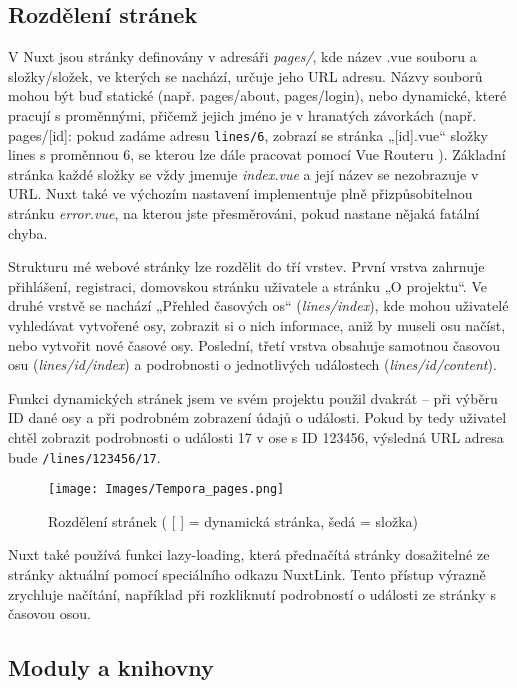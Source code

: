 \subsection{Rozdělení stránek}
V Nuxt jsou stránky definovány v adresáři \textit{pages/}, kde název .vue souboru a složky/složek, ve kterých se nachází, určuje jeho URL adresu. Názvy souborů mohou být buď statické (např. pages/about, pages/login), nebo dynamické, které pracují s proměnnými, přičemž jejich jméno je v hranatých závorkách (např. pages/[id]: pokud zadáme adresu \texttt{lines/6}, zobrazí se stránka „[id].vue“ složky lines s proměnnou 6, se kterou lze dále pracovat pomocí Vue Routeru \cite{NUXT}). Základní stránka každé složky se vždy jmenuje \textit{index.vue} a její název se nezobrazuje v URL. Nuxt také ve výchozím nastavení implementuje plně přizpůsobitelnou stránku \textit{error.vue}, na kterou jste přesměrováni, pokud nastane nějaká fatální chyba.

Strukturu mé webové stránky lze rozdělit do tří vrstev. První vrstva zahrnuje přihlášení, registraci, domovskou stránku uživatele a stránku „O projektu“. Ve druhé vrstvě se nachází „Přehled časových os“ (\textit{lines/index}), kde mohou uživatelé vyhledávat vytvořené osy, zobrazit si o nich informace, aniž by museli osu načíst, nebo vytvořit nové časové osy. Poslední, třetí vrstva obsahuje samotnou časovou osu (\textit{lines/id/index}) a podrobnosti o jednotlivých událostech (\textit{lines/id/content}).

Funkci dynamických stránek jsem ve svém projektu použil dvakrát – při výběru ID dané osy a při podrobném zobrazení údajů o události. Pokud by tedy uživatel chtěl zobrazit podrobnosti o události 17 v ose s ID 123456, výsledná URL adresa bude \texttt{/lines/123456/17}.


\begin{figure}[h]
    \centering
    \texttt{[image: Images/Tempora\_pages.png]}
    \caption{Rozdělení stránek ( [ ] = dynamická stránka, šedá = složka)}
    \label{fig:pages}
\end{figure}
Nuxt také používá funkci lazy-loading, která přednačítá stránky dosažitelné ze stránky aktuální pomocí speciálního odkazu NuxtLink. Tento přístup výrazně zrychluje načítání, například při rozkliknutí podrobností o události ze stránky s časovou osou.

\subsection{Moduly a knihovny}

